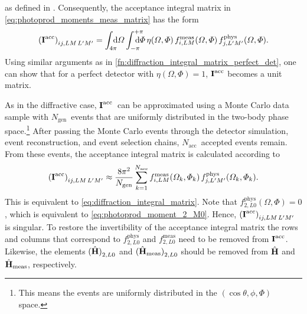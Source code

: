as defined in
.
Consequently, the acceptance integral matrix in
\cref{eq:photoprod_moments_meas_matrix} has the form
\begin{equation}
  \label{eq:photoprod_integral_matrix}
  \rBrk[0]{\mat{I}^\text{acc}}_{i j, L M\, L' M'}
  = \int_{4 \pi}\!\!\!\! \dif{\Omega} \int_{-\pi}^{+\pi}\hspace{-1.2em} \dif{\Phi}\,
  \eta(\Omega, \Phi)\,
  f_{i, L M}^\text{meas}(\Omega, \Phi)\,
  f_{j, L' M'}^\text{phys}(\Omega, \Phi).
\end{equation}
Using similar arguments as in
\cref{fn:diffraction_integral_matrix_perfect_det}, one can show that
for a perfect detector with $\eta(\Omega, \Phi) = 1$,
$\bm{\mathrm{I}}^\text{acc}$ becomes a unit matrix.

As in the diffractive case, $\bm{\mathrm{I}}^\text{acc}$~can be approximated
using a Monte Carlo data sample with $N_\text{gen}$~events that are
uniformly distributed in the two-body phase space.\footnote{This means
the events are uniformly distributed in the $(\cos\theta, \phi, \Phi)$
space.}  After passing the Monte Carlo events through the detector
simulation, event reconstruction, and event selection chains,
$N_\text{acc}$~accepted events remain.  From these events, the
acceptance integral matrix is calculated according to
\begin{equation}
  \label{eq:photoprod_integral_matrix_mc}
  \rBrk[0]{\mat{I}^\text{acc}}_{i j, L M\, L' M'}
  \approx \frac{8 \pi^2}{N_\text{gen}} \sum_{k = 1}^{N_\text{acc}}
  f_{i, L M}^\text{meas}(\Omega_k, \Phi_k)\,
  f_{j, L' M'}^\text{phys}(\Omega_k, \Phi_k).
\end{equation}
This is equivalent to \cref{eq:diffraction_integral_matrix}.  Note
that $f^\text{phys}_{2, L 0}(\Omega, \Phi) = 0$, which is equivalent
to \cref{eq:photoprod_moment_2_M0}.  Hence,
$\rBrk[0]{\mat{I}^\text{acc}}_{i j, L M\, L' M'}$ is singular.  To
restore the invertibility of the acceptance integral matrix the rows
and columns that correspond to $f^\text{phys}_{2, L 0}$ and
$f^\text{meas}_{2, L 0}$ need to be removed from $\bm{\mathrm{I}}^\text{acc}$.
Likewise, the elements $\rBrk[0]{\hat{\vect{H}}}_{2, L 0}$ and
$\rBrk[0]{\hat{\vect{H}}_\text{meas}}_{2, L 0}$ should be removed from
$\hat{\bm{\mathrm{H}}}$ and $\hat{\bm{\mathrm{H}}}_\text{meas}$, respectively.

